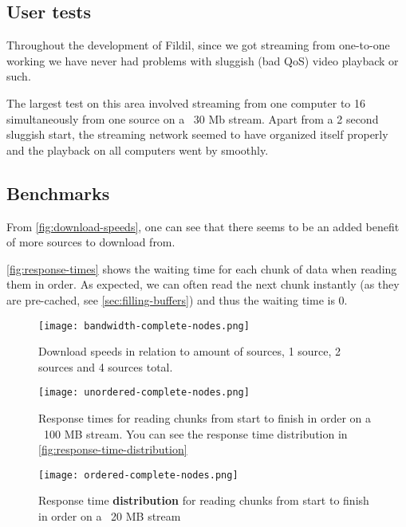 \documentclass[10pt, a4paper]{article}
\begin{document}
\subsection{User tests}

Throughout the development of Fildil, since we got streaming from one-to-one
working we have never had problems with sluggish (bad QoS) video playback or
such.

The largest test on this area involved streaming from one computer to 16
simultaneously from one source on a ~30 Mb stream. Apart from a 2 second
sluggish start, the streaming network seemed to have organized itself properly
and the playback on all computers went by smoothly.

\subsection{Benchmarks}
\label{sec:benchmarks}

From \autoref{fig:download-speeds}, one can see that there seems to be an added
benefit of more sources to download from.

\autoref{fig:response-times} shows the waiting time for each chunk of data when
reading them in order. As expected, we can often read the next chunk instantly
(as they are pre-cached, see \autoref{sec:filling-buffers}) and thus the waiting
time is 0.

\begin{figure}[H]
\centering
\texttt{[image: bandwidth-complete-nodes.png]}
\caption{Download speeds in relation to amount of sources, 1 source, 2 sources
  and 4 sources total.}
\label{fig:download-speeds}
\end{figure}

\begin{figure}[H]
\centering
\texttt{[image: unordered-complete-nodes.png]}
\caption{Response times for reading chunks from start to finish in order on a
  ~100 MB stream. You can see the response time distribution in
  \autoref{fig:response-time-distribution}}
\label{fig:response-times}
\end{figure}

\begin{figure}[H]
\centering
\texttt{[image: ordered-complete-nodes.png]}
\caption{Response time \textbf{distribution} for reading chunks from start to
  finish in order on a ~20 MB stream}
\label{fig:response-time-distribution}
\end{figure}
\end{document}
